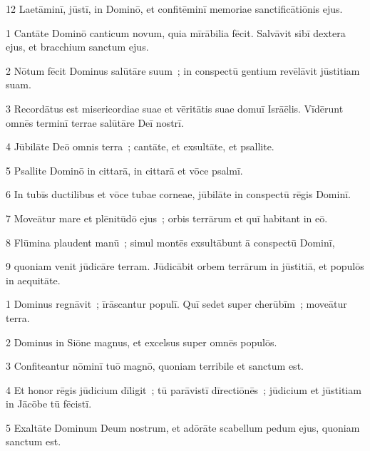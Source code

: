 \psalmVerse
  {\phantom{0}12}
  {Laetāminī, jūstī, in Dominō, et confitēminī memoriae sanctificātiōnis ejus.}




\psalmVerse
  {\phantom{00}1}
  {Cantāte Dominō canticum novum, quia mīrābilia fēcit. Salvāvit sibī dextera ejus, et bracchium sanctum ejus.}


\psalmVerse
  {\phantom{00}2}
  {Nōtum fēcit Dominus salūtāre suum~; in conspectū gentium revēlāvit jūstitiam suam.}


\psalmVerse
  {\phantom{00}3}
  {Recordātus est misericordiae suae et vēritātis suae domuī Isrāēlis. Vīdērunt omnēs terminī terrae salūtāre Deī nostrī.}


\psalmVerse
  {\phantom{00}4}
  {Jūbilāte Deō omnis terra~; cantāte, et exsultāte, et psallite.}


\psalmVerse
  {\phantom{00}5}
  {Psallite Dominō in cittarā, in cittarā et vōce psalmī.}


\psalmVerse
  {\phantom{00}6}
  {In tubīs ductilibus et vōce tubae corneae, jūbilāte in conspectū rēgis Dominī.}


\psalmVerse
  {\phantom{00}7}
  {Moveātur mare et plēnitūdō ejus~; orbis terrārum et quī habitant in eō.}


\psalmVerse
  {\phantom{00}8}
  {Flūmina plaudent manū~; simul montēs exsultābunt ā conspectū Dominī,}


\psalmVerse
  {\phantom{00}9}
  {quoniam venit jūdicāre terram. Jūdicābit orbem terrārum in jūstitiā, et populōs in aequitāte.}



\psalmVerse
  {\phantom{00}1}
  {Dominus regnāvit~; īrāscantur populī. Quī sedet super cherūbīm~; moveātur terra.}


\psalmVerse
  {\phantom{00}2}
  {Dominus in Siōne magnus, et excelsus super omnēs populōs.}


\psalmVerse
  {\phantom{00}3}
  {Confiteantur nōminī tuō magnō, quoniam terribile et sanctum est.}


\psalmVerse
  {\phantom{00}4}
  {Et honor rēgis jūdicium dīligit~; tū parāvistī dīrectiōnēs~; jūdicium et jūstitiam in Jācōbe tū fēcistī.}


\psalmVerse
  {\phantom{00}5}
  {Exaltāte Dominum Deum nostrum, et adōrāte scabellum pedum ejus, quoniam sanctum est.}


